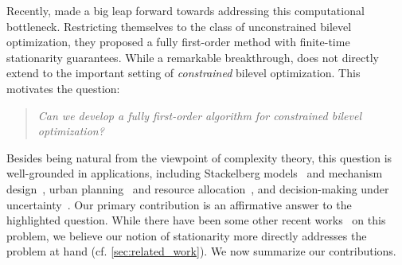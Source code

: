 Recently, \cite{liu2022bome} made a big leap forward towards addressing this computational bottleneck.  %
Restricting themselves to the class of unconstrained bilevel optimization, they proposed a fully first-order method with finite-time stationarity guarantees. While a remarkable breakthrough,  \cite{liu2022bome} does not directly extend to the important setting of \textit{constrained} bilevel optimization. This motivates the question: 
\begin{quote}
\centering
    \emph{Can we develop a fully first-order algorithm for constrained bilevel optimization?}
\end{quote}
Besides being natural from the viewpoint of complexity theory, this question is well-grounded
in applications, including Stackelberg models~\cite{simaan1973stackelberg,paruchuri2008playing,chu2014integrated} and mechanism design~\cite{wang2022coordinating,dutting2021optimal},  urban planning~\cite{miao2010modeling,kang2010bilevel} and resource allocation~\cite{xu2013bilevel,gutjahr2016bi,zhang2010bilevel,fathollahi2022bi}, and decision-making under uncertainty~\cite{elmachtoub2022smart,munoz2022bilevel,wilder2019melding}.
Our primary contribution is an affirmative answer to the highlighted question. While there have been some other recent works~\cite{khanduri2023linearly, yao2024constrained, lu2024firstorder} on this problem, 
 we believe our notion of stationarity more directly addresses the problem at hand
(cf. \cref{sec:related_work}).  We now summarize our contributions.

